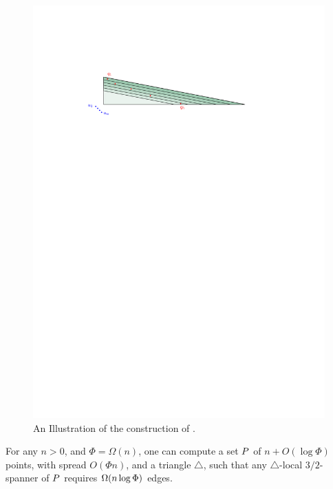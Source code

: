\documentclass[12pt]{article}%
\begin{document}
\begin{figure}[h]
    \centering \includegraphics{figs/triangle_lower_bound}
    \caption{An Illustration of the construction of 
       .}
\end{figure}

\begin{lemma}
    For any $n > 0$, and $\Phi = \Omega(n)$, one can compute a set
    $P$ of $n+ O(\log\Phi)$ points, with spread $O(\Phi n)$, and a
    triangle $\triangle$, such that any $\triangle$-local
    $3/2$-spanner of $P$ requires $\Omega\pth{n\log\Phi }$ edges.
\end{lemma}
\end{document}
